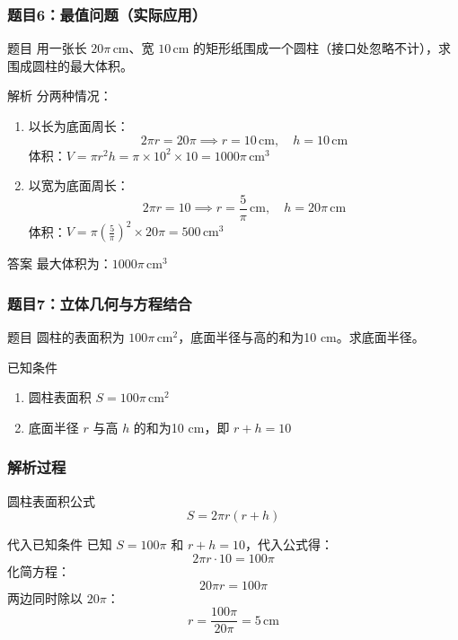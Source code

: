 \begin{frame}[allowframebreaks]
    \frametitle{题目6：最值问题（实际应用）}
    \begin{block}{题目}
        用一张长 \(20\pi \, \text{cm}\)、宽 \(10 \, \text{cm}\) 的矩形纸围成一个圆柱（接口处忽略不计），求围成圆柱的最大体积。
    \end{block}
    
    \begin{block}{解析}
        分两种情况：
        \begin{enumerate}
            \item 以长为底面周长：
            \[
            2\pi r = 20\pi \implies r = 10 \, \text{cm}, \quad h = 10 \, \text{cm}
            \]
            体积：\( V = \pi r^2 h = \pi \times 10^2 \times 10 = 1000\pi \, \text{cm}^3 \)
            
            \item 以宽为底面周长：
            \[
            2\pi r = 10 \implies r = \frac{5}{\pi} \, \text{cm}, \quad h = 20\pi \, \text{cm}
            \]
            体积：\( V = \pi \left(\frac{5}{\pi}\right)^2 \times 20\pi = 500 \, \text{cm}^3 \)
        \end{enumerate}
    \end{block}
    
    \begin{alertblock}{答案}
        最大体积为：\(1000\pi \, \text{cm}^3\)
    \end{alertblock}
\end{frame}

\begin{frame}
    \frametitle{题目7：立体几何与方程结合}
    
    \begin{block}{题目}
        圆柱的表面积为 \(100\pi \, \text{cm}^2\)，底面半径与高的和为10 cm。求底面半径。
    \end{block}
    \begin{alertblock}{已知条件}
        \begin{enumerate}
            \item 圆柱表面积 \( S = 100\pi \, \text{cm}^2 \)
            \item 底面半径 \( r \) 与高 \( h \) 的和为10 cm，即 \( r + h = 10 \)
        \end{enumerate}
    \end{alertblock}
    

\end{frame}
\begin{frame}
    \frametitle{解析过程}
    
    \begin{block}{圆柱表面积公式}
        \[
        S = 2\pi r(r + h)
        \]
    \end{block}
    
    \begin{block}{代入已知条件}
        已知 \( S = 100\pi \) 和 \( r + h = 10 \)，代入公式得：
        \[
        2\pi r \cdot 10 = 100\pi
        \]
        化简方程：
        \[
        20\pi r = 100\pi
        \]
        两边同时除以 \( 20\pi \)：
        \[
        r = \frac{100\pi}{20\pi} = 5 \, \text{cm}
        \]
    \end{block}
\end{frame}
